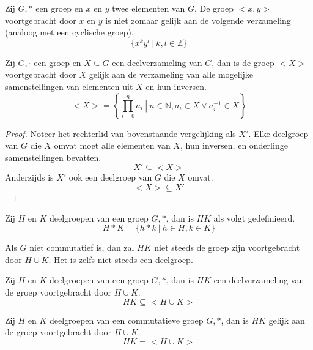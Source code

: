 \documentclass[main.tex]{subfiles}
\begin{document}
\begin{opm}
  Zij $G,*$ een groep en $x$ en $y$ twee elementen van $G$.
  De groep $<x,y>$ voortgebracht door $x$ en $y$ is niet zomaar gelijk aan de volgende verzameling (analoog met een cyclische groep).
  \[ \{ x^{k}y^{l}\ |\ k,l\in \mathbb{Z} \} \]
\end{opm}

\begin{ei}
  Zij $G,\cdot$ een groep en $X \subseteq G$ een deelverzameling van $G$, dan is de groep $<X>$ voortgebracht door $X$ gelijk aan de verzameling van alle mogelijke samenstellingen van elementen uit $X$ en hun inversen.
  \[ <X> = \left\{ \prod_{i=0}^{n}a_{i} \ \left|\ n\in \mathbb{N}, a_{i}\in X \vee a_{i}^{-1} \in X \right.\right\}\]

  \begin{proof}
    Noteer het rechterlid van bovenstaande vergelijking als $X'$.
    Elke deelgroep van $G$ die $X$ omvat moet alle elementen van $X$, hun inversen, en onderlinge samenstellingen bevatten.
    \[ X' \subseteq <X> \]
    Anderzijds is $X'$ ook een deelgroep van $G$ die $X$ omvat.
    \[ <X> \subseteq X' \]
  \end{proof}
\end{ei}


\begin{de}
  Zij $H$ en $K$ deelgroepen van een groep $G,*$, dan is $HK$ als volgt gedefinieerd.
  \[ H*K = \{ h*k\ |\ h\in H, k\in K \} \]
\end{de}

\begin{opm}
  \label{opm:verm-deelgroepen-niet-noodzakelijk-deelgroep}
  Als $G$ niet commutatief is, dan zal $HK$ niet steeds de groep zijn voortgebracht door $H\cup K$.
  Het is zelfs niet steeds een deelgroep.
\end{opm}

\begin{st}
  \label{st:verm-deelgroepen-deel-van-voortbrenging-van-unie}
  Zij $H$ en $K$ deelgroepen van een groep $G,*$, dan is $HK$ een deelverzameling van de groep voortgebracht door $H\cup K$.
  \[ HK \subseteq <H\cup K> \]
\end{st}

\begin{st}
  \examen
  Zij $H$ en $K$ deelgroepen van een commutatieve groep $G,*$, dan is $HK$ gelijk aan de groep voortgebracht door $H\cup K$.
  \[ HK = <H\cup K> \]
\end{st}
\end{document}
